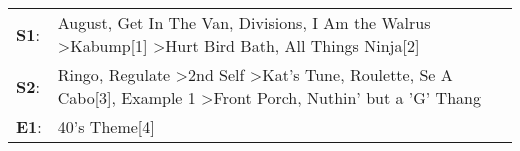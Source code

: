 \begin{supertabular}{p{0.03\textwidth}p{0.92\textwidth}}
 \textbf{S1}:  &                                                                                August\textsuperscript{}, \enspace Get In The Van\textsuperscript{}, \enspace Divisions\textsuperscript{}, \enspace I Am the Walrus\textsuperscript{} \textgreater \enspace Kabump[1]\textsuperscript{} \textgreater \enspace Hurt Bird Bath\textsuperscript{}, \enspace All Things Ninja[2]\textsuperscript{}  \enspace  \\
 \textbf{S2}:  &  Ringo\textsuperscript{}, \enspace Regulate\textsuperscript{} \textgreater \enspace 2nd Self\textsuperscript{} \textgreater \enspace Kat's Tune\textsuperscript{}, \enspace Roulette\textsuperscript{}, \enspace Se A Cabo[3]\textsuperscript{}, \enspace Example 1\textsuperscript{} \textgreater \enspace Front Porch\textsuperscript{}, \enspace Nuthin' but a 'G' Thang\textsuperscript{}  \enspace  \\
 \textbf{E1}:  &                                                                                                                                                                                                                                                                                                                                                               40's Theme[4]\textsuperscript{}  \enspace  \\
\end{supertabular}

